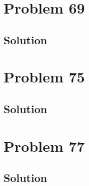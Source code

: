 \documentclass[12pt]{article}
\begin{document}
    \pagebreak
    \section{Problem 69}

        \subsection{Solution}

    \pagebreak
    \section{Problem 75}

        \subsection{Solution}

    \pagebreak
    \section{Problem 77}

        \subsection{Solution}

    \pagebreak
    
    \tableofcontents
\end{document}
